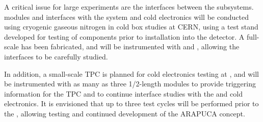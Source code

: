 
A critical issue for large experiments are the interfaces between the subsystems.  modules and interfaces with the  system and cold electronics will be conducted using cryogenic gaseous nitrogen in cold box studies at CERN, using a test stand developed for testing of  components prior to installation into the detector.  A full-scale   has been fabricated, 
and will be instrumented with  and , allowing the interfaces to be carefully studied.

In addition, a small-scale TPC is planned for cold electronics testing at , and will be instrumented with as many as three 1/2-length  modules to provide triggering information for the TPC and to continue interface studies with the  and cold electronics.  It is envisioned that up to three test cycles will be performed prior to the , allowing testing and continued development of the ARAPUCA concept.


%
